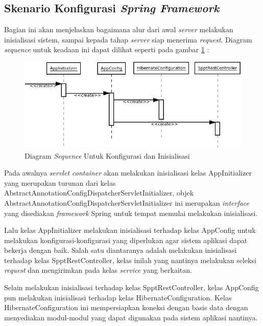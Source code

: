 \subsection{Skenario Konfigurasi \textit{Spring Framework}}

Bagian ini akan menjelaskan bagaimana alur dari awal \textit{server} melakukan inisialisasi sistem, sampai kepada tahap \textit{server} siap menerima \textit{request}. Diagram \textit{sequence} untuk keadaan ini dapat dilihat seperti pada gambar \ref{fig:uml-seq-konf} :
  
  \begin{figure}[H]
    \centering
    \includegraphics[width=1\textwidth]{./resources/uml/uml-seq-konf}
    \caption{Diagram \textit{Sequence} Untuk Konfigurasi dan Inisialisasi}
    \label{fig:uml-seq-konf}
  \end{figure}
  
  Pada awalnya \textit{servlet container} akan melakukan inisialisasi kelas AppInitializer yang merupakan turunan dari kelas AbstractAnnotationConfigDispatcherServletInitializer, objek AbstractAnnotationConfigDispatcherServletInitializer ini merupakan \textit{interface} yang disediakan \textit{framework} Spring untuk tempat memulai melakukan inisialisasi.
  
  Lalu kelas AppInitializer melakukan inisialisasi terhadap kelas AppConfig untuk melakukan konfigurasi-konfigurasi yang diperlukan agar sistem aplikasi dapat bekerja dengan baik. Salah satu diantaranya adalah melakukan inisialisasi terhadap kelas SpptRestController, kelas inilah yang nantinya melakukan seleksi \textit{request} dan mengirimkan pada kelas \textit{service} yang berkaitan.
  
  Selain melakukan inisialisasi terhadap kelas SpptRestController, kelas AppConfig pun melakukan inisialisasi terhadap kelas HibernateConfiguration. Kelas HibernateConfiguration ini mempersiapkan koneksi dengan basis data dengan menyediakan modul-modul yang dapat digunakan pada sistem aplikasi nantinya.
  
